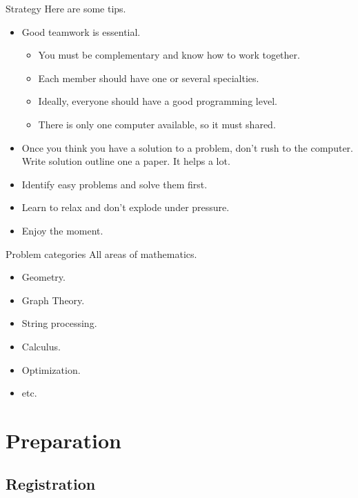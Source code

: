 \documentclass{beamer}
\begin{document}
\begin{frame}{Strategy}
Here are some tips.
\begin{itemize}
  \justifying
  \item Good teamwork is essential.
    \begin{itemize}
      \item You must be complementary and know how to work together.
      \item Each member should have one or several specialties.
      \item Ideally, everyone should have a good programming level.
      \item There is only one computer available, so it must shared.
    \end{itemize}
  \item Once you think you have a solution to a problem, don't rush to the computer. Write solution outline one a paper. It helps a lot.
  \item Identify easy problems and solve them first.
  \item Learn to relax and don't explode under pressure.
  \item Enjoy the moment.
\end{itemize}
\end{frame}

\begin{frame}{Problem categories}
All areas of mathematics.
\begin{itemize}
  \justifying
  \item Geometry.
  \item Graph Theory.
  \item String processing.
  \item Calculus.
  \item Optimization.
  \item etc.
\end{itemize}
\end{frame}

\section{Preparation}

\subsection{Registration}
\end{document}

